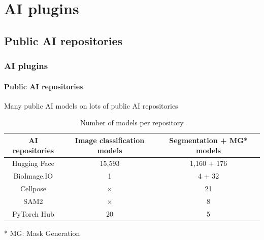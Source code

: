 \def\sectiontitle{AI plugins}

\section{\sectiontitle}

\def\slidetitle{Public AI repositories}

\subsection{\slidetitle}
\begin{frame}
  \frametitle{\sectiontitle}
  \framesubtitle{\slidetitle}

  Many public AI models on lots of public AI repositories

  \begin{center}
    \begin{table}
      \begin{tabular}{|c|c|c|}
       \hline
       \rowcolor{tableFirstRowColor} AI repositories & Image classification models & Segmentation + MG* models \\ [0.5ex]
       \hline
       \cellcolor{tableFirstColColor} Hugging Face & 15,593 & 1,160 + 176 \\
       \hline
       \cellcolor{tableFirstColColor} BioImage.IO & 1 & 4 + 32 \\
       \hline
       \cellcolor{tableFirstColColor} Cellpose & $\times$ & 21 \\
       \hline
       \cellcolor{tableFirstColColor} SAM2 & $\times$ & 8 \\
       \hline
       \cellcolor{tableFirstColColor} PyTorch Hub & 20 & 5 \\
       \hline
      \end{tabular}
      \caption{Number of models per repository}
    \end{table}
  \end{center}

  * MG: Mask Generation

\end{frame}

\def\slidetitle{Unlock these repositories}

